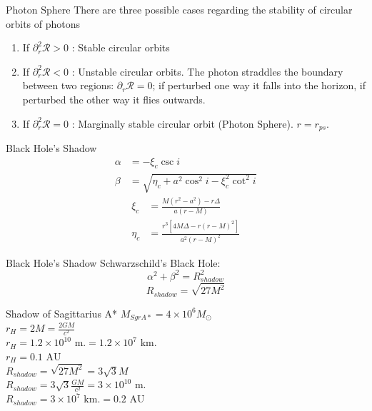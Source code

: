 \documentclass{beamer}
\begin{document}
\begin{darkframes}
\begin{frame}{Photon Sphere}
	There are three possible cases regarding the stability of circular orbits of photons
	\pause
	\begin{enumerate}
	\item If $\partial_r^2 \mathcal{R} > 0$ : Stable circular orbits
	\pause
	\item If $\partial_r^2 \mathcal{R} < 0$ : Unstable circular orbits. The photon straddles the boundary between two regions: $\partial_r \mathcal{R} = 0$; if perturbed one way it falls into the horizon, if perturbed the other way it flies outwards.
	\pause
	\item If $\partial_r^2 \mathcal{R} = 0$ : Marginally stable circular orbit (Photon Sphere). $r=r_{ps}$.
	\end{enumerate}	 
\end{frame}

\begin{frame}{Black Hole's Shadow}
	\begin{align*}
	\alpha &= -\xi_c \csc i\\	
	\beta &= \sqrt{\eta_c + a^2 \cos^2 i - \xi_c^2 \cot^2 i}
	\end{align*}
	\pause
	\begin{align*}
	\xi_c &= \frac{M(r^2 -a^2) - r \Delta}{a(r-M)} \\
	\eta_c &= \frac{r^3 \left[ 4M\Delta - r (r-M)^2\right]}{a^2(r-M)^2}
	\end{align*}
\end{frame}

\begin{frame}{Black Hole's Shadow}
	Schwarzschild's Black Hole:	
	\[ \alpha^2 + \beta^2 = R_{shadow}^2\]
	\pause
	\[ R_{shadow} = \sqrt{27 M^2} \]
\end{frame}

\begin{frame}{Shadow of Sagittarius A*}
	$M_{SgrA*} = 4 \times 10^6 M_\odot\ $\\
	\bigskip
	\pause
	$r_H = 2 M = \frac{2GM}{c^2}$\\
	\pause
	$r_H = 1.2 \times 10^{10} \textrm{ m.} = 1.2 \times 10^{7} \textrm{ km.}$ \\
	\pause
	$r_H = 0.1 \textrm{ AU} $\\
	\bigskip
	\pause
	$R_{shadow} = \sqrt{27 M^2} = 3 \sqrt{3} M$\\
	\pause
	$R_{shadow} = 3 \sqrt{3} \frac{GM}{c^2} = 3 \times 10^{10} \textrm{ m.}$ \\
	\pause
	$R_{shadow} = 3 \times 10^{7} \textrm{ km.} = 0.2 \textrm{ AU} $ \\
\end{frame}


\end{darkframes}
\end{document}
